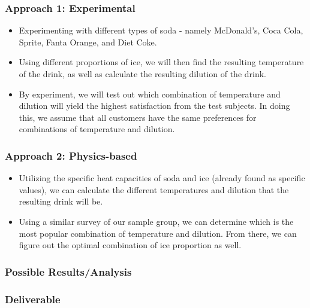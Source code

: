 \documentclass[compress,handout,10pt]{beamer}
\let\olditem\item
\renewcommand{\item}{\setlength{\itemsep}{0.5\baselineskip}\olditem}
\begin{document}
\begin{frame}
    \frametitle{Approach 1: Experimental}

\begin {itemize}
\item Experimenting with different types of soda - namely  McDonald's, Coca Cola, Sprite, Fanta Orange, and Diet Coke.
\item Using different proportions of ice, we will then find the resulting temperature of the drink, as well as calculate the resulting dilution of the drink. 
\item By experiment, we will test out which combination of temperature and dilution will yield the highest satisfaction from the test subjects. In doing this, we assume that all customers have the same preferences for combinations of temperature and dilution.
\end{itemize}

\end{frame}


\begin{frame}
    \frametitle{Approach 2: Physics-based}


\begin {itemize}
\item Utilizing the specific heat capacities of soda and ice (already found as specific values), we can calculate the different temperatures and dilution that the resulting drink will be.
\item Using a similar survey of our sample group, we can determine which is the most popular combination of temperature and dilution. From there, we can figure out the optimal combination of ice proportion as well.
\end{itemize}

\end{frame}
 



\begin{frame}
    \frametitle{Possible Results/Analysis}
\end{frame}

\begin{frame}
    \frametitle{Deliverable}
\end{frame}
\end{document}
